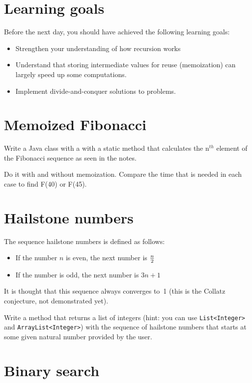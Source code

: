 \documentclass{article}
\begin{document}
\section*{Learning goals}
\label{sec:learning-goals}

Before the next day, you should have achieved the following learning
goals: 

\begin{itemize}
\item Strengthen your understanding of how recursion works
\item Understand that storing intermediate values for reuse
  (memoization) can largely speed up some computations. 
\item Implement divide-and-conquer solutions to problems. 
\end{itemize}

\section{Memoized Fibonacci}

Write a Java class with a with a static method that calculates 
the n$^{th}$ element of the Fibonacci sequence as seen in the notes.

Do it with and without memoization. Compare
the time that is needed in each case to find F(40) or F(45). 

\section{Hailstone numbers}
\label{sec:hailstone-numbers}

The sequence hailstone numbers is defined as follows:

\begin{itemize}
\item If the number $n$ is even, the next number is $n \over 2$
\item If the number is odd, the next number is $3n + 1$
\end{itemize}

It is thought that this sequence always converges 
to~1 (this is the Collatz conjecture,
not demonstrated yet). 

Write a method that returns a list of integers
(hint: you can use \verb+List<Integer>+ and \verb+ArrayList<Integer>+) 
with the sequence of hailstone numbers that starts at some
given natural number provided by the user. 

\section{Binary search}
\label{sec:binary-search}
\end{document}
